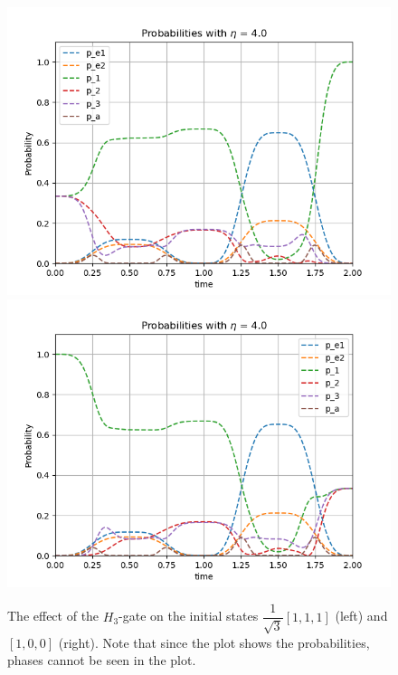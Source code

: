 \begin{figure}[H]
\includegraphics[scale=0.5]{figures/pop_plot_H111.png}
\includegraphics[scale=0.5]{figures/pop_plot_H100.png}
\caption{The effect of the $H_3$-gate on the initial states $\dfrac{1}{\sqrt{3}}[1,1,1]$ (left) and $[1,0,0]$ (right). Note that since the plot shows the probabilities, phases cannot be seen in the plot.}
\label{fig:pop_H}
\end{figure}


